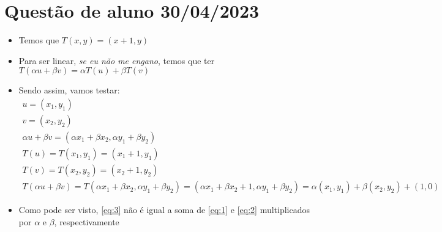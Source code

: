 \documentclass[brazilian, fleqn]{article}
\begin{document}
\section*{\centering Questão de aluno 30/04/2023}
\begin{itemize}
    \item Temos que \(T(x,y)=(x+1,y)\)
    \item Para ser linear, \textit{se eu não me engano}, temos que ter \(T(\alpha u + \beta v)=\alpha T(u)+\beta T(v)\)
    \item Sendo assim, vamos testar:
        \begin{gather}
            u=(x_1,y_1) \\
            v=(x_2,y_2) \\
            \alpha u + \beta v = (\alpha x_1 +  \beta x_2, \alpha y_1 + \beta y_2) \\
            T(u)=T(x_1,y_1)=(x_1+1,y_1) \label{eq:1} \\
            T(v)=T(x_2,y_2)=(x_2+1,y_2) \label{eq:2} \\
            T(\alpha u + \beta v) = T(\alpha x_1 +  \beta x_2, \alpha y_1 + \beta y_2) =
            (\alpha x_1 + \beta x_2 + 1, \alpha y_1 + \beta y_2) = 
            \alpha (x_1, y_1) + \beta (x_2,y_2) + (1,0) \label{eq:3}
        \end{gather}
    \item Como pode ser visto, \eqref{eq:3} não é igual a soma de \eqref{eq:1} e \eqref{eq:2} multiplicados por
        \(\alpha\) e \(\beta\), respectivamente
\end{itemize}
\end{document}
